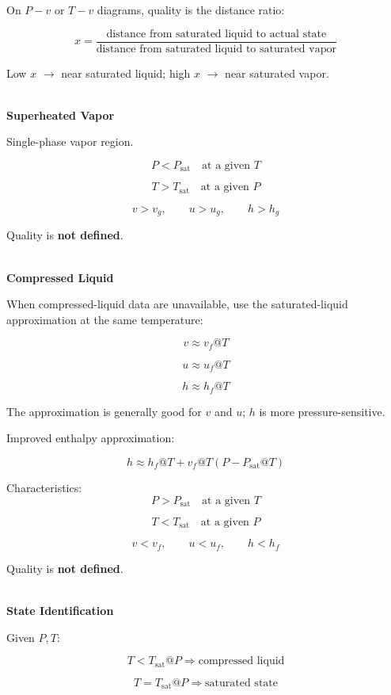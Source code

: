 \documentclass[12pt]{article}
\begin{document}
On $P-v$ or $T-v$ diagrams, quality is the distance ratio:

\[
\boxed{
x=
\frac{\text{distance from saturated liquid to actual state}}
{\text{distance from saturated liquid to saturated vapor}}
}
\]

Low $x$ $\rightarrow$ near saturated liquid; high $x$ $\rightarrow$ near saturated vapor.

\textbf{\\ Superheated Vapor}

Single-phase vapor region.

\[
\boxed{P<P_{\mathrm{sat}}\quad\text{at a given }T}
\]

\[
\boxed{T>T_{\mathrm{sat}}\quad\text{at a given }P}
\]

\[
\boxed{v>v_g,\qquad u>u_g,\qquad h>h_g}
\]

Quality is \textbf{not defined}.

\textbf{\\ Compressed Liquid}

When compressed-liquid data are unavailable, use the saturated-liquid approximation at the same temperature:

\[
\boxed{v\approx v_f@T}
\]

\[
\boxed{u\approx u_f@T}
\]

\[
\boxed{h\approx h_f@T}
\]

The approximation is generally good for $v$ and $u$; $h$ is more pressure-sensitive.

Improved enthalpy approximation:

\[
\boxed{
h\approx h_f@T+
v_f@T
\left(P-P_{\mathrm{sat}}@T\right)
}
\]

Characteristics:
\[
\boxed{P>P_{\mathrm{sat}}\quad\text{at a given }T}
\]

\[
\boxed{T<T_{\mathrm{sat}}\quad\text{at a given }P}
\]

\[
\boxed{v<v_f,\qquad u<u_f,\qquad h<h_f}
\]

Quality is \textbf{not defined}.

\textbf{\\ State Identification}

Given $P,T$:

\[
\boxed{
T<T_{\mathrm{sat}}@P
\Rightarrow
\text{compressed liquid}
}
\]

\[
\boxed{
T=T_{\mathrm{sat}}@P
\Rightarrow
\text{saturated state}
}
\]
\end{document}
